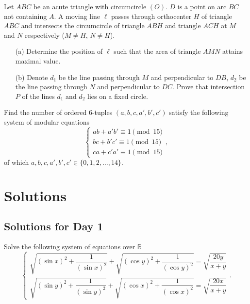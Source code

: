 \documentclass[11pt]{article}
\begin{document}
        \boom
    
        \begin{exercise}
            Let \(ABC\) be an acute triangle with circumcircle \((O)\). \(D\) is a point on arc \(BC\) not containing \(A\). A moving line \(\ell\) passes through orthocenter \(H\) of triangle \(ABC\) and intersects the circumcircle of triangle \(ABH\) and triangle \(ACH\) at \(M\) and \(N\) respectively (\(M \neq H\), \(N \neq H\)).
            \begin{enumerate}
                \item[(a)] Determine the position of \(\ell\) such that the area of triangle \(AMN\) attains maximal value.
                \item[(b)] Denote \(d_1\) be the line passing through \(M\) and perpendicular to \(DB\), \(d_2\) be the line passing through \(N\) and perpendicular to \(DC\). Prove that intersection \(P\) of the lines \(d_1\) and \(d_2\) lies on a fixed circle.
            \end{enumerate}
        \end{exercise}
    
        \boom
    
        \begin{exercise}
            Find the number of ordered 6-tuples \((a,b,c,a',b',c')\) satisfy the following system of modular equations
            \[\begin{cases}
                ab + a'b' \equiv 1 \pmod{15} \\
                bc + b'c' \equiv 1 \pmod{15} \\
                ca + c'a' \equiv 1 \pmod{15} 
            \end{cases},\]
            of which \(a,b,c,a',b',c' \in \{0,1,2,\dots,14\}\).
        \end{exercise}

    \newpage

\section{Solutions}

    \subsection{Solutions for Day 1}

        \begin{problem}
            Solve the following system of equations over \(\mathbb{R}\)
            \[\begin{cases}
                \sqrt{\left(\sin x\right)^2 + \dfrac{1}{\left(\sin x\right)^2}} + \sqrt{\left(\cos y\right)^2 + \dfrac{1}{\left(\cos y\right)^2}} = \sqrt{\dfrac{20y}{x + y}} \\
                \sqrt{\left(\sin y\right)^2 + \dfrac{1}{\left(\sin y\right)^2}} + \sqrt{\left(\cos x\right)^2 + \dfrac{1}{\left(\cos x\right)^2}} = \sqrt{\dfrac{20x}{x + y}}
            \end{cases}.\]
        \end{problem}
\end{document}
